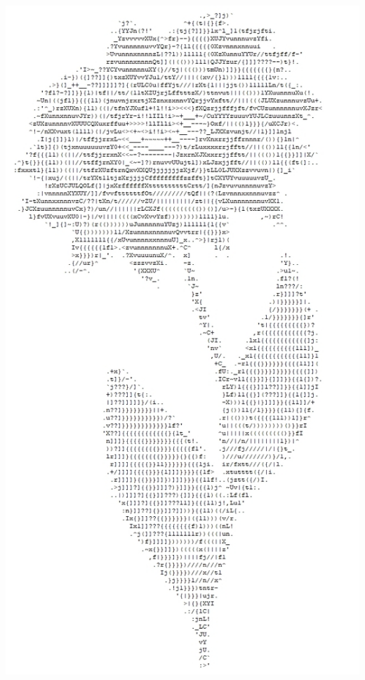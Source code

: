 \documentclass[polish, 11pt]{article}
\begin{document}
    \begin{minipage}[t]{.33\textwidth}
        \includegraphics[width=\textwidth]{kwiatek4.jpg}
    \end{minipage}%
\end{document}

